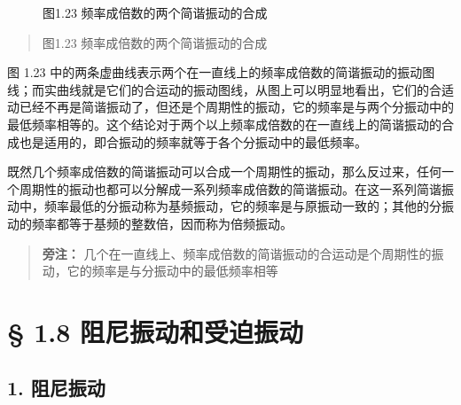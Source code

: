 \begin{figure}
\centering
{}
\caption{图1.23 频率成倍数的两个简谐振动的合成}
\end{figure}

\begin{quote}
图1.23 频率成倍数的两个简谐振动的合成
\end{quote}

图 1.23
中的两条虚曲线表示两个在一直线上的频率成倍数的简谐振动的振动图线；而实曲线就是它们的合运动的振动图线，从图上可以明显地看出，它们的合适动已经不再是简谐振动了，但还是个周期性的振动，它的频率是与两个分振动中的最低频率相等的。这个结论对于两个以上频率成倍数的在一直线上的简谐振动的合成也是适用的，即合振动的频率就等于各个分振动中的最低频率。

既然几个频率成倍数的简谐振动可以合成一个周期性的振动，那么反过来，任何一个周期性的振动也都可以分解成一系列频率成倍数的简谐振动。在这一系列简谐振动中，频率最低的分振动称为基频振动，它的频率是与原振动一致的；其他的分振动的频率都等于基频的整数倍，因而称为倍频振动。

\begin{quote}
\textbf{旁注：}
几个在一直线上、频率成倍数的简谐振动的合运动是个周期性的振动，它的频率是与分振动中的最低频率相等
\end{quote}

\section{§ 1.8
阻尼振动和受迫振动}\label{ux963bux5c3cux632fux52a8ux548cux53d7ux8febux632fux52a8}

\subsection{1. 阻尼振动}\label{ux963bux5c3cux632fux52a8}

